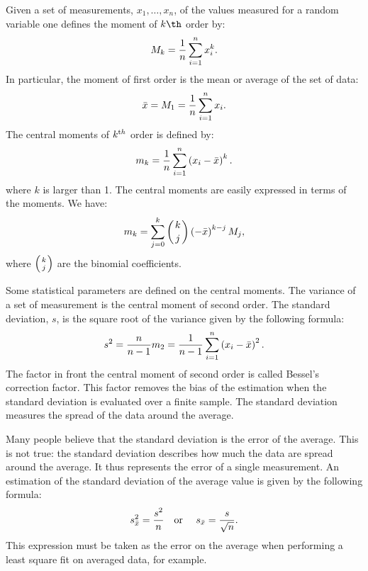 Given a set of measurements, $x_1,\ldots,x_n$, of the values
measured for a random variable one defines the moment of $k\th$
order by:
\begin{equation}
  M_k={1\over n}\sum_{i=1}^n x_i^k.
\end{equation}
In particular, the moment of first order is the mean or average of
the set of data:
\begin{equation}
\label{eq:average}
  \bar{x}=M_1={1\over n}\sum_{i=1}^n x_i.
\end{equation}
The central moments of $k^{\mathop{\textrm th}}$ order is defined by:
\begin{equation}
  m_k={1\over n}\sum_{i=1}^n \left(x_i-\bar{x}\right)^k.
\end{equation}
where $k$ is larger than 1. The central moments are easily
expressed in terms of the moments. We have:
\begin{equation}
  m_k=\sum_{j=0}^k \left({k \atop j}\right)\left(-\bar{x}\right)^{k-j}M_j,
\end{equation}
where $\left({k \atop j}\right)$ are the binomial coefficients.

Some statistical parameters are defined on the central moments.
The variance of a set of measurement is the central moment of
second order. The standard deviation, $s$, is the square root of
the variance given by the following formula:
\begin{equation}
s^2={\displaystyle n \over \displaystyle n-1}m_2 ={\displaystyle 1
\over \displaystyle n-1} \sum_{i=1}^n \left(x_i-\bar{x}\right)^2.
\end{equation}
The factor in front the central moment of second order is called
Bessel's correction factor. This factor removes the bias of the
estimation when the standard deviation is evaluated over a finite
sample. The standard deviation measures the spread of the data
around the average.

Many people believe that the standard deviation is the error of
the average. This is not true: the standard deviation describes
how much the data are spread around the average. It thus
represents the error of a single measurement. An estimation of the
standard deviation of the average value is given by the following
formula:
\begin{equation}
\label{eq:averagerror}
  s_{\bar{x}}^2={\displaystyle s^2 \over n}
  \mbox{\quad or \quad}
  s_{\bar{x}}={\displaystyle s \over \sqrt{n}}.
\end{equation}
This expression must be taken as the error on the average when
performing a least square fit on averaged data, for example.

